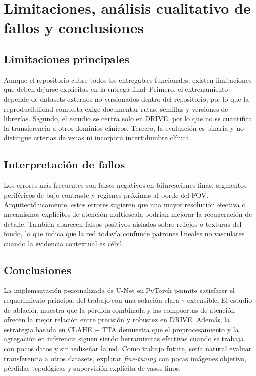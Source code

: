 \section{Limitaciones, análisis cualitativo de fallos y conclusiones}
\subsection{Limitaciones principales}
Aunque el repositorio cubre todos los entregables funcionales, existen limitaciones que deben dejarse explícitas en la entrega final. Primero, el entrenamiento depende de datasets externos no versionados dentro del repositorio, por lo que la reproducibilidad completa exige documentar rutas, semillas y versiones de librerías. Segundo, el estudio se centra solo en DRIVE, por lo que no se cuantifica la transferencia a otros dominios clínicos. Tercero, la evaluación es binaria y no distingue arterias de venas ni incorpora incertidumbre clínica.

\subsection{Interpretación de fallos}
Los errores más frecuentes son falsos negativos en bifurcaciones finas, segmentos periféricos de bajo contraste y regiones próximas al borde del FOV. Arquitectónicamente, estos errores sugieren que una mayor resolución efectiva o mecanismos explícitos de atención multiescala podrían mejorar la recuperación de detalle. También aparecen falsos positivos aislados sobre reflejos o texturas del fondo, lo que indica que la red todavía confunde patrones lineales no vasculares cuando la evidencia contextual es débil.

\subsection{Conclusiones}
La implementación personalizada de U-Net en PyTorch permite satisfacer el requerimiento principal del trabajo con una solución clara y extensible. El estudio de ablación muestra que la pérdida combinada y las compuertas de atención ofrecen la mejor relación entre precisión y robustez en DRIVE. Además, la estrategia basada en CLAHE + TTA demuestra que el preprocesamiento y la agregación en inferencia siguen siendo herramientas efectivas cuando se trabaja con pocos datos y sin rediseñar la red. Como trabajo futuro, sería natural evaluar transferencia a otros datasets, explorar \emph{fine-tuning} con pocas imágenes objetivo, pérdidas topológicas y supervisión explícita de vasos finos.
